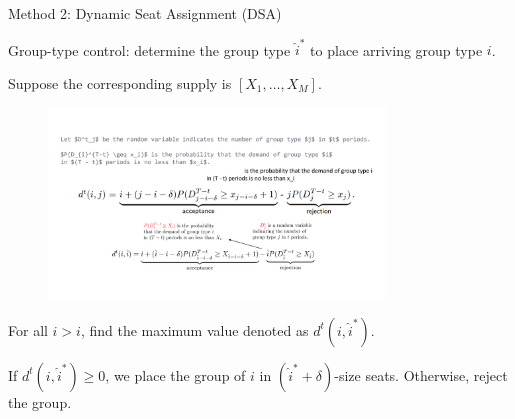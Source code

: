   
  

  
  

    

    \begin{frame}{Method 2: Dynamic Seat Assignment (DSA)}
      
      {\color{red} Group-type control}: determine the group type $\hat{i}^{*}$ to place arriving group type $i$. 
      
      \vspace{0.2cm}

      Suppose the corresponding supply is $[X_1, \ldots, X_M]$. 

      \vspace{-0.1cm}
  
      \begin{figure}[h]
        \centering
        \includegraphics[width = 0.8\textwidth]{./images/group_type.pdf}
      \end{figure}
  
      \vspace{-0.1cm}
  
      For all $\hat{i} > i$, find the maximum value denoted as $d^{t}(i, \hat{i}^{*})$.
      
      If $d^{t}(i, \hat{i}^{*}) \geq 0$, we place the group of $i$ in $(\hat{i}^{*} + \delta)$-size seats. Otherwise, reject the group.
  

    \end{frame}

